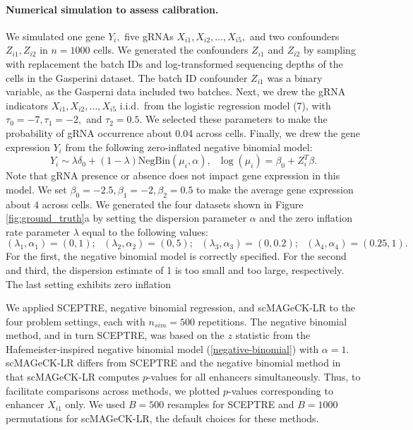\documentclass{nature}
\begin{document}
\paragraph{Numerical simulation to assess calibration.}

We simulated one gene $Y_i,$ five gRNAs $X_{i1}, X_{i2}, \dots, X_{i5},$ and two confounders $Z_{i1}, Z_{i2}$ in $n = 1000$ cells. We generated the confounders $Z_{i1}$ and $Z_{i2}$ by sampling with replacement the batch IDs and log-transformed sequencing depths of the cells in the Gasperini dataset. The batch ID confounder $Z_{i1}$ was a binary variable, as the Gasperni data included two batches. Next, we drew the gRNA indicators $X_{i1}, X_{i2}, \dots, X_{i5}$ i.i.d.\ from the logistic regression model (7), with $\tau_0 = -7, \tau_1 = -2,$ and $\tau_2 = 0.5$. We selected these parameters to make the probability of gRNA occurrence about 0.04 across cells. Finally, we drew the gene expression $Y_i$ from the following zero-inflated negative binomial model:
$$ Y_i \sim \lambda \delta_0 + (1 - \lambda) \textrm{NegBin}(\mu_i, \alpha), \textrm{ } \log(\mu_i) = \beta_0 + Z_i^T \beta.$$ Note that gRNA presence or absence does not impact gene expression in this model. 
We set $\beta_0 = -2.5, \beta_1 = -2, \beta_2 = 0.5$ to make the average gene expression about $4$ across cells. We generated the four datasets shown in Figure \ref{fig:ground_truth}a by setting the dispersion parameter $\alpha$ and the zero inflation rate parameter $\lambda$ equal to the following values:
$$ (\lambda_1, \alpha_1) = (0,1) ; \textrm{    } (\lambda_2, \alpha_2) = (0, 5); \textrm{     } (\lambda_3, \alpha_3) = (0, 0.2); \textrm{     } (\lambda_4, \alpha_4) = (0.25, 1).$$ For the first, the negative binomial model is correctly specified. For the second and third, the dispersion estimate of 1 is too small and too large, respectively. The last setting exhibits zero inflation

We applied SCEPTRE, negative binomial regression, and scMAGeCK-LR\cite{Yang2020} to the four problem settings, each with $n_{sim} = 500$ repetitions. The negative binomial method, and in turn SCEPTRE, was based on the $z$ statistic from the Hafemeister-inspired negative binomial model (\ref{negative-binomial}) with $\alpha = 1$.  scMAGeCK-LR differs from SCEPTRE and the negative binomial method in that scMAGeCK-LR computes $p$-values for all enhancers simultaneously. Thus, to facilitate comparisons across methods, we plotted $p$-values corresponding to enhancer $X_{i1}$ only. We used $B = 500$ resamples for SCEPTRE and $B = 1000$ permutations for scMAGeCK-LR, the default choices for these methods.
\end{document}
